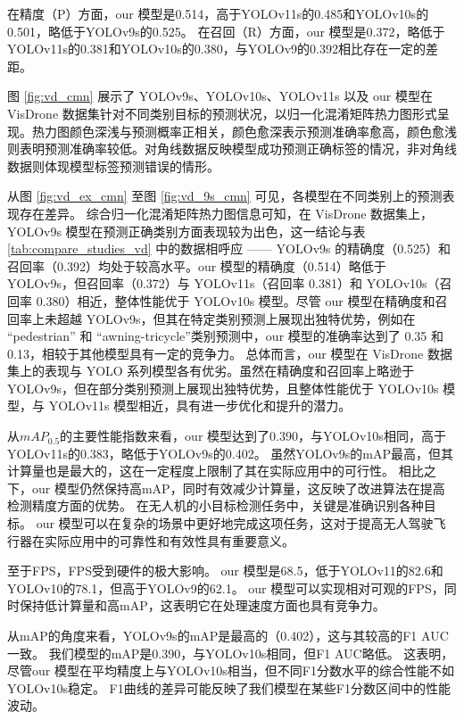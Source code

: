 在精度（P）方面，our 模型是0.514，高于YOLOv11s的0.485和YOLOv10s的0.501，略低于YOLOv9s的0.525。 在召回（R）方面，our 模型是0.372，略低于YOLOv11s的0.381和YOLOv10s的0.380，与YOLOv9的0.392相比存在一定的差距。

图 \ref{fig:vd_cmn} 展示了 YOLOv9s、YOLOv10s、YOLOv11s 以及 our 模型在 VisDrone 数据集针对不同类别目标的预测状况，以归一化混淆矩阵热力图形式呈现。热力图颜色深浅与预测概率正相关，颜色愈深表示预测准确率愈高，颜色愈浅则表明预测准确率较低。对角线数据反映模型成功预测正确标签的情况，非对角线数据则体现模型标签预测错误的情形。

从图 \ref{fig:vd_ex_cmn} 至图 \ref{fig:vd_9s_cmn} 可见，各模型在不同类别上的预测表现存在差异。
综合归一化混淆矩阵热力图信息可知，在 VisDrone 数据集上，YOLOv9s 模型在预测正确类别方面表现较为出色，这一结论与表 \ref{tab:compare_studies_vd} 中的数据相呼应 —— YOLOv9s 的精确度（0.525）和召回率（0.392）均处于较高水平。our 模型的精确度（0.514）略低于 YOLOv9s，但召回率（0.372）与 YOLOv11s（召回率 0.381）和 YOLOv10s（召回率 0.380）相近，整体性能优于 YOLOv10s 模型。尽管 our 模型在精确度和召回率上未超越 YOLOv9s，但其在特定类别预测上展现出独特优势，例如在 “pedestrian” 和 “awning-tricycle”类别预测中，our 模型的准确率达到了 0.35 和 0.13，相较于其他模型具有一定的竞争力。
总体而言，our 模型在 VisDrone 数据集上的表现与 YOLO 系列模型各有优劣。虽然在精确度和召回率上略逊于 YOLOv9s，但在部分类别预测上展现出独特优势，且整体性能优于 YOLOv10s 模型，与 YOLOv11s 模型相近，具有进一步优化和提升的潜力。

从$mAP_{0.5}$的主要性能指数来看，our 模型达到了0.390，与YOLOv10s相同，高于YOLOv11s的0.383，略低于YOLOv9s的0.402。 虽然YOLOv9s的mAP最高，但其计算量也是最大的，这在一定程度上限制了其在实际应用中的可行性。 相比之下，our 模型仍然保持高mAP，同时有效减少计算量，这反映了改进算法在提高检测精度方面的优势。 在无人机的小目标检测任务中，关键是准确识别各种目标。 our 模型可以在复杂的场景中更好地完成这项任务，这对于提高无人驾驶飞行器在实际应用中的可靠性和有效性具有重要意义。

至于FPS，FPS受到硬件的极大影响。 our 模型是68.5，低于YOLOv11的82.6和YOLOv10的78.1，但高于YOLOv9的62.1。 our 模型可以实现相对可观的FPS，同时保持低计算量和高mAP，这表明它在处理速度方面也具有竞争力。

从mAP的角度来看，YOLOv9s的mAP是最高的（0.402），这与其较高的F1 AUC一致。 我们模型的mAP是0.390，与YOLOv10s相同，但F1 AUC略低。 这表明，尽管our 模型在平均精度上与YOLOv10s相当，但不同F1分数水平的综合性能不如YOLOv10s稳定。 F1曲线的差异可能反映了我们模型在某些F1分数区间中的性能波动。

